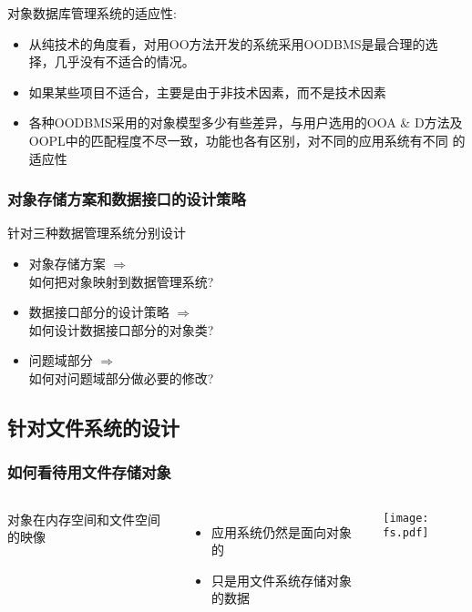 \documentclass[compress]{beamer}
\begin{document}
\begin{frame}
   {
    对象数据库管理系统的适应性:
    \begin{itemize}
      \item 从纯技术的角度看，对用OO方法开发的系统采用OODBMS是最合理的选
        择，几乎没有不适合的情况。

      \item 如果某些项目不适合，主要是由于非技术因素，而不是技术因素  

      \item 各种OODBMS采用的对象模型多少有些差异，与用户选用的OOA \& D方法及
        OOPL中的匹配程度不尽一致，功能也各有区别，对不同的应用系统有不同
        的适应性 
    \end{itemize}
  }

\end{frame}


\begin{frame}
  \frametitle{对象存储方案和数据接口的设计策略}
  针对三种数据管理系统分别设计
  \begin{itemize}
    \item 对象存储方案 $\Longrightarrow$ \\
       \quad 如何把对象映射到数据管理系统?
    \item 数据接口部分的设计策略 $\Longrightarrow$  \\
       \quad 如何设计数据接口部分的对象类?
    \item 问题域部分 $\Longrightarrow$ \\
       \quad 如何对问题域部分做必要的修改?
  \end{itemize}
\end{frame}

\subsection[文件系统]{针对文件系统的设计}

\begin{frame}
  \frametitle{如何看待用文件存储对象}
  \begin{columns}[t]
    \column{0.6\hsize}

  对象在内存空间和文件空间的映像
  \begin{itemize}
    \item 应用系统仍然是面向对象的
    \item 只是用文件系统存储对象的数据
  \end{itemize}

    \column{0.4\hsize}

  \centering\texttt{[image: fs.pdf]}
\end{columns}
\end{frame}
\end{document}
